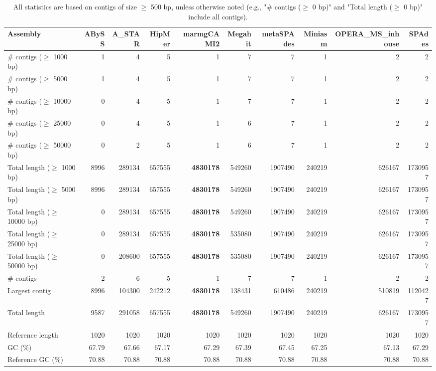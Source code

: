 \documentclass[12pt,a4paper]{article}
\begin{document}
\begin{table}[ht]
\begin{center}
\caption{All statistics are based on contigs of size $\geq$ 500 bp, unless otherwise noted (e.g., "\# contigs ($\geq$ 0 bp)" and "Total length ($\geq$ 0 bp)" include all contigs).}
\begin{tabular}{|l*{9}{|r}|}
\hline
Assembly & ABySS & A\_STAR & HipMer & marmgCAMI2 & Megahit & metaSPAdes & Miniasm & OPERA\_MS\_inhouse & SPAdes \\ \hline
\# contigs ($\geq$ 1000 bp) & 1 & 4 & 5 & 1 & 7 & 7 & 1 & 2 & 2 \\ \hline
\# contigs ($\geq$ 5000 bp) & 1 & 4 & 5 & 1 & 7 & 7 & 1 & 2 & 2 \\ \hline
\# contigs ($\geq$ 10000 bp) & 0 & 4 & 5 & 1 & 7 & 7 & 1 & 2 & 2 \\ \hline
\# contigs ($\geq$ 25000 bp) & 0 & 4 & 5 & 1 & 6 & 7 & 1 & 2 & 2 \\ \hline
\# contigs ($\geq$ 50000 bp) & 0 & 2 & 5 & 1 & 6 & 7 & 1 & 2 & 2 \\ \hline
Total length ($\geq$ 1000 bp) & 8996 & 289134 & 657555 & {\bf 4830178} & 549260 & 1907490 & 240219 & 626167 & 1730957 \\ \hline
Total length ($\geq$ 5000 bp) & 8996 & 289134 & 657555 & {\bf 4830178} & 549260 & 1907490 & 240219 & 626167 & 1730957 \\ \hline
Total length ($\geq$ 10000 bp) & 0 & 289134 & 657555 & {\bf 4830178} & 549260 & 1907490 & 240219 & 626167 & 1730957 \\ \hline
Total length ($\geq$ 25000 bp) & 0 & 289134 & 657555 & {\bf 4830178} & 535080 & 1907490 & 240219 & 626167 & 1730957 \\ \hline
Total length ($\geq$ 50000 bp) & 0 & 208600 & 657555 & {\bf 4830178} & 535080 & 1907490 & 240219 & 626167 & 1730957 \\ \hline
\# contigs & 2 & 6 & 5 & 1 & 7 & 7 & 1 & 2 & 2 \\ \hline
Largest contig & 8996 & 104300 & 242212 & {\bf 4830178} & 138431 & 610486 & 240219 & 510819 & 1120427 \\ \hline
Total length & 9587 & 291058 & 657555 & {\bf 4830178} & 549260 & 1907490 & 240219 & 626167 & 1730957 \\ \hline
Reference length & 1020 & 1020 & 1020 & 1020 & 1020 & 1020 & 1020 & 1020 & 1020 \\ \hline
GC (\%) & 67.79 & 67.66 & 67.17 & 67.29 & 67.39 & 67.45 & 67.25 & 67.13 & 67.29 \\ \hline
Reference GC (\%) & 70.88 & 70.88 & 70.88 & 70.88 & 70.88 & 70.88 & 70.88 & 70.88 & 70.88 \\ \hline

\end{tabular}
\end{center}
\end{table}
\end{document}
